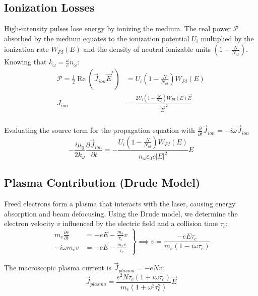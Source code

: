 \subsection*{Ionization Losses}
High-intensity pulses lose energy by ionizing the medium. The real power $\mathcal{P}$ absorbed by the medium equates to the ionization potential $U_i$ multiplied by the ionization rate $W_{PI}(E)$ and the density of neutral ionizable units $(1-\frac{N}{N_{at}})$. Knowing that $k_{\omega} = \frac{\omega}{c} n_{\omega}$:
\begin{align}
\mathcal{P} = \frac{1}{2} \operatorname{Re}(\vec{J}_{ion} \vec{E}^*) &= U_i \left(1-\frac{N}{N_{at}}\right) W_{PI}(E) \nonumber \\
J_{ion} &= \frac{2 U_i \left(1-\frac{N}{N_{at}}\right) W_{PI}(E) \vec{E}}{|\vec{E}|^2}
\end{align}

Evaluating the source term for the propagation equation with $\frac{\partial}{\partial t}\vec{J}_{ion} = -i\omega\vec{J}_{ion}$ \begin{equation}
- \frac{i \mu_0}{2 k_{\omega}} \frac{\partial \vec{J}_{ion}}{\partial t} = - \frac{U_i \left(1-\frac{N}{N_{at}}\right) W_{PI}(E)}{n_{\omega} \varepsilon_0 c |E|^2} E
\end{equation}

\subsection*{Plasma Contribution (Drude Model)}
Freed electrons form a plasma that interacts with the laser, causing energy absorption and beam defocusing. Using the Drude model, we determine the electron velocity $v$ influenced by the electric field and a collision time $\tau_c$:
\begin{equation*}
\left. \begin{aligned}
m_e \frac{\partial v}{\partial t} &= -e E - \frac{m_e}{\tau_c} v \\
- i \omega m_e v &= -e E - \frac{m_e v}{\tau_c}
\end{aligned} \right\} \implies v = \frac{-e E \tau_c}{m_e (1 - i \omega \tau_c)}
\end{equation*}

The macroscopic plasma current is $\vec{J}_{plasma} = -e N v$:
\begin{equation}
\vec{J}_{plasma} = \frac{e^2 N \tau_c (1 + i \omega \tau_c)}{m_e (1 + \omega^2 \tau_c^2)}\vec{E}
\end{equation}

